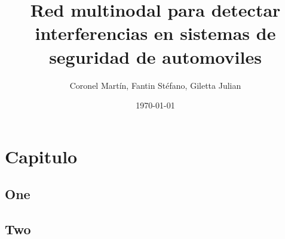 \documentclass[12pt]{report}
\title{\bf Red multinodal para detectar interferencias en sistemas de seguridad de automoviles}
\author{Coronel Martín, Fantin Stéfano, Giletta Julian}
\date{\today}
\begin{document}
\cleardoublepage
\pagebreak
{}

\maketitle

\tableofcontents

\cleardoublepage
{}
\section{Capitulo}
\subsection{One}
\pagebreak
\subsection{Two}
\end{document}
